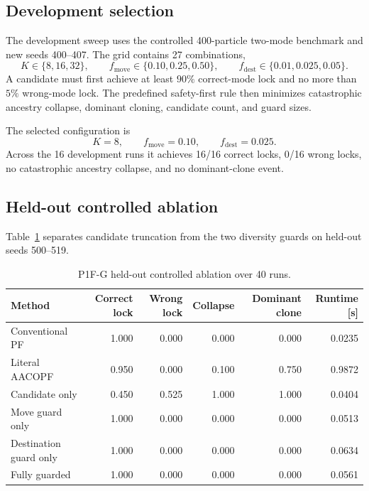 \subsection{Development selection}
The development sweep uses the controlled 400-particle two-mode benchmark and new seeds 400--407. The grid contains 27 combinations,
\[
K\in\{8,16,32\},\qquad
f_{\mathrm{move}}\in\{0.10,0.25,0.50\},\qquad
f_{\mathrm{dest}}\in\{0.01,0.025,0.05\}.
\]
A candidate must first achieve at least \(90\%\) correct-mode lock and no more than \(5\%\) wrong-mode lock. The predefined safety-first rule then minimizes catastrophic ancestry collapse, dominant cloning, candidate count, and guard sizes.

The selected configuration is
\begin{equation}
    \boxed{
    K=8,\qquad
    f_{\mathrm{move}}=0.10,\qquad
    f_{\mathrm{dest}}=0.025.
    }
\end{equation}
Across the 16 development runs it achieves 16/16 correct locks, 0/16 wrong locks, no catastrophic ancestry collapse, and no dominant-clone event.

\subsection{Held-out controlled ablation}
Table~\ref{tab:p1fg_controlled} separates candidate truncation from the two diversity guards on held-out seeds 500--519.

\begin{table}[htbp]
    \centering
    \caption{P1F-G held-out controlled ablation over 40 runs.}
    \label{tab:p1fg_controlled}
    \begin{tabular}{lrrrrr}
        \toprule
        Method & Correct lock & Wrong lock & Collapse & Dominant clone & Runtime [s]\\
        \midrule
        Conventional PF       & 1.000 & 0.000 & 0.000 & 0.000 & 0.0235\\
        Literal AACOPF        & 0.950 & 0.000 & 0.100 & 0.750 & 0.9872\\
        Candidate only        & 0.450 & 0.525 & 1.000 & 1.000 & 0.0404\\
        Move guard only       & 1.000 & 0.000 & 0.000 & 0.000 & 0.0513\\
        Destination guard only& 1.000 & 0.000 & 0.000 & 0.000 & 0.0634\\
        Fully guarded         & 1.000 & 0.000 & 0.000 & 0.000 & 0.0561\\
        \bottomrule
    \end{tabular}
\end{table}


